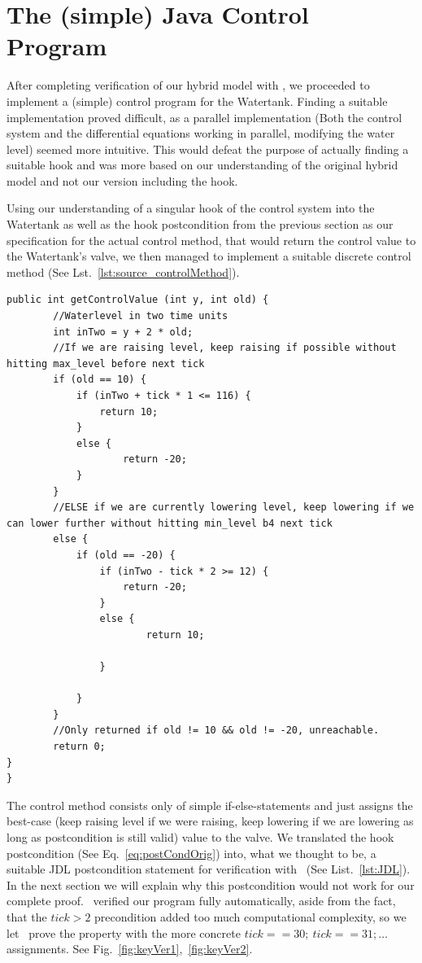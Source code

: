 \section{The (simple) Java Control Program}
\label{sec:Watertank:Java}

After completing verification of our hybrid model with \keym, we proceeded to implement a (simple) control program for the Watertank. Finding a suitable implementation proved difficult, as a parallel implementation (Both the control system and the differential equations working in parallel, modifying the water level) seemed more intuitive. This would defeat the purpose of actually finding a suitable hook and was more based on our understanding of the original hybrid model and not our version including the hook.

Using our understanding of a singular hook of the control system into the Watertank as well as the hook postcondition from the previous section as our specification for the actual control method, that would return the control value to the Watertank's valve, we then managed to implement a suitable discrete control method (See Lst.~\ref{lst:source_controlMethod}).

\begin{lstlisting}[label=lst:source_controlMethod]
public int getControlValue (int y, int old) {
		//Waterlevel in two time units
		int inTwo = y + 2 * old;
		//If we are raising level, keep raising if possible without hitting max_level before next tick
		if (old == 10) {
			if (inTwo + tick * 1 <= 116) {
				return 10;
			}
			else {
					return -20;
			}
		}
		//ELSE if we are currently lowering level, keep lowering if we can lower further without hitting min_level b4 next tick
		else {
			if (old == -20) {
				if (inTwo - tick * 2 >= 12) {
					return -20;
				}
				else {
						return 10;
				
				}
		
			}
		}
		//Only returned if old != 10 && old != -20, unreachable.
		return 0;
}
}
\end{lstlisting}

The control method consists only of simple if-else-statements and just assigns the best-case (keep raising level if we were raising, keep lowering if we are lowering as long as postcondition is still valid) value to the valve. We translated the hook postcondition (See  Eq.~\ref{eq:postCondOrig}) into, what we thought to be, a suitable JDL postcondition statement for verification with \key~(See List.~\ref{lst:JDL}). In the next section we will explain why this postcondition would not work for our complete proof. \key~verified our program fully automatically, aside from the fact, that the \(tick>2\) precondition added too much computational complexity, so we let \key~prove the property with the more concrete \(tick==30;~tick==31;\dots\) assignments. See Fig.~\ref{fig:keyVer1},~\ref{fig:keyVer2}.

